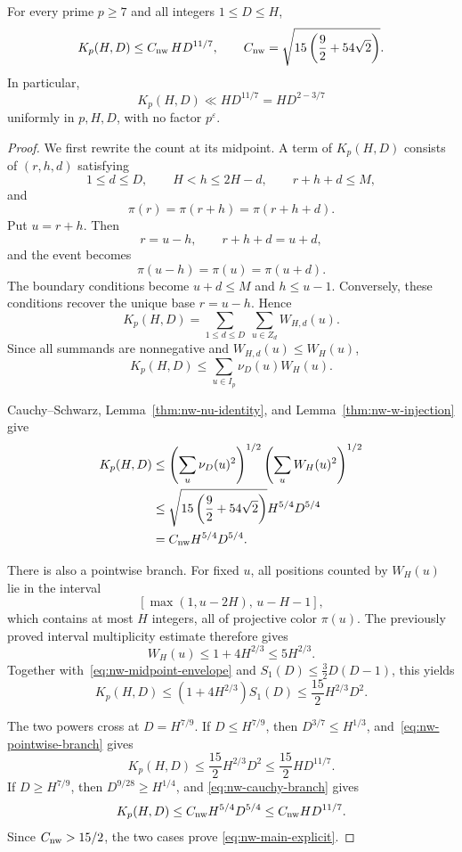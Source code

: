 \begin{theorem}[near-wall bound with $\eta=3/7$]
\label{thm:nw-near-wall}
For every prime $p\ge7$ and all integers $1\le D\le H$,
\begin{equation}\label{eq:nw-main-explicit}
 K_p(H,D)
 \le C_{\rm nw}\,H D^{11/7},
 \qquad
 C_{\rm nw}
 =\sqrt{15\left(\frac92+54\sqrt2\right)}.
\end{equation}
In particular,
\[
 K_p(H,D)\ll H D^{11/7}=H D^{2-3/7}
\]
uniformly in $p,H,D$, with no factor $p^\varepsilon$.
\end{theorem}

\begin{proof}
We first rewrite the count at its midpoint.  A term of
$K_p(H,D)$ consists of $(r,h,d)$ satisfying
\[
 1\le d\le D,
 \qquad
 H<h\le2H-d,
 \qquad
 r+h+d\le M,
\]
and
\[
 \pi(r)=\pi(r+h)=\pi(r+h+d).
\]
Put $u=r+h$.  Then
\[
 r=u-h,
 \qquad
 r+h+d=u+d,
\]
and the event becomes
\[
 \pi(u-h)=\pi(u)=\pi(u+d).
\]
The boundary conditions become $u+d\le M$ and $h\le u-1$.  Conversely,
these conditions recover the unique base $r=u-h$.  Hence
\begin{equation}\label{eq:nw-midpoint-identity}
 K_p(H,D)
 =\sum_{1\le d\le D}\ \sum_{u\in Z_d}W_{H,d}(u).
\end{equation}
Since all summands are nonnegative and
$W_{H,d}(u)\le W_H(u)$,
\begin{equation}\label{eq:nw-midpoint-envelope}
 K_p(H,D)\le\sum_{u\in I_p}\nu_D(u)W_H(u).
\end{equation}

Cauchy--Schwarz, Lemma~\ref{thm:nw-nu-identity}, and
Lemma~\ref{thm:nw-w-injection} give
\begin{align}
 K_p(H,D)
 &\le
 \left(\sum_u\nu_D(u)^2\right)^{1/2}
 \left(\sum_uW_H(u)^2\right)^{1/2}\notag\\
 &\le
 \sqrt{15\left(\frac92+54\sqrt2\right)}
 H^{5/4}D^{5/4}\notag\\
 &=C_{\rm nw}H^{5/4}D^{5/4}.
 \label{eq:nw-cauchy-branch}
\end{align}

There is also a pointwise branch.  For fixed $u$, all positions counted by
$W_H(u)$ lie in the interval
\[
 [\max(1,u-2H),\,u-H-1],
\]
which contains at most $H$ integers, all of projective color $\pi(u)$.
The previously proved interval multiplicity estimate therefore gives
\[
 W_H(u)\le1+4H^{2/3}\le5H^{2/3}.
\]
Together with~\eqref{eq:nw-midpoint-envelope} and
$S_1(D)\le\frac32D(D-1)$, this yields
\begin{equation}\label{eq:nw-pointwise-branch}
 K_p(H,D)
 \le\left(1+4H^{2/3}\right)S_1(D)
 \le\frac{15}{2}H^{2/3}D^2.
\end{equation}

The two powers cross at $D=H^{7/9}$.  If $D\le H^{7/9}$, then
$D^{3/7}\le H^{1/3}$, and~\eqref{eq:nw-pointwise-branch} gives
\[
 K_p(H,D)
 \le\frac{15}{2}H^{2/3}D^2
 \le\frac{15}{2}H D^{11/7}.
\]
If $D\ge H^{7/9}$, then $D^{9/28}\ge H^{1/4}$, and
\eqref{eq:nw-cauchy-branch} gives
\[
 K_p(H,D)
 \le C_{\rm nw}H^{5/4}D^{5/4}
 \le C_{\rm nw}H D^{11/7}.
\]
Since $C_{\rm nw}>15/2$, the two cases prove
\eqref{eq:nw-main-explicit}.
\end{proof}

